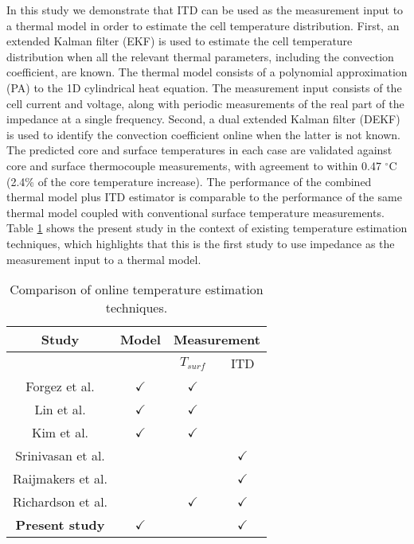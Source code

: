 \documentclass[journal, english]{IEEEtran}
\providecommand{\tabularnewline}{\\}
\begin{document}
In this study we demonstrate that ITD can be used as the measurement input
to a thermal model in order to estimate the cell temperature distribution.
First, an extended Kalman filter (EKF) is used to estimate the cell temperature distribution when all the relevant thermal parameters, including the convection coefficient, are known. The thermal model consists of a polynomial approximation (PA) to the 1D cylindrical heat equation. The measurement input consists of the cell current and voltage, along with periodic measurements of the real part of
the impedance at a single frequency. Second, a dual extended Kalman
filter (DEKF) is used to identify the convection coefficient online
when the latter is not known. The predicted core and surface temperatures in each case are validated against core and surface thermocouple measurements, with agreement to within 0.47 $^{\circ}$C (2.4\% of the core temperature increase). The performance of the combined thermal model plus ITD estimator is comparable to
the performance of the same thermal model coupled with conventional
surface temperature measurements. Table \ref{tab:comparison of techniques}
shows the present study in the context of existing temperature estimation
techniques, which highlights that this is the first study to use impedance
as the measurement input to a thermal model.
\begin{table}[h]
\begin{centering}
\begin{tabular}{|c|c|c|c|}
\hline 
Study & Model & \multicolumn{2}{c|}{Measurement}\tabularnewline
\hline 
\hline 
 &  & $T_{surf}$ & ITD\tabularnewline
\hline 
Forgez et al. \cite{Forgez2010a} & $\checkmark$ & $\checkmark$ & \tabularnewline
\hline 
Lin et al. \cite{Lin2013f, Lin2014} & $\checkmark$ & $\checkmark$ & \tabularnewline
\hline 
Kim et al. \cite{Kim2013, Kim2014b} & $\checkmark$ & $\checkmark$ & \tabularnewline
\hline 
Srinivasan et al. \cite{Srinivasan2011c, Srinivasan2012a} &  &  & $\checkmark$\tabularnewline
\hline 
Raijmakers et al. \cite{Raijmakers2014d} &  &  & $\checkmark$\tabularnewline
\hline 
Richardson et al. \cite{Richardson2014} &  & $\checkmark$ & $\checkmark$\tabularnewline
\hline 
\textbf{Present study} & $\checkmark$ &  & $\checkmark$\tabularnewline
\hline 
\end{tabular}
\par\end{centering}
\caption{Comparison of online temperature estimation techniques.\label{tab:comparison of techniques}}
\end{table}
\end{document}
